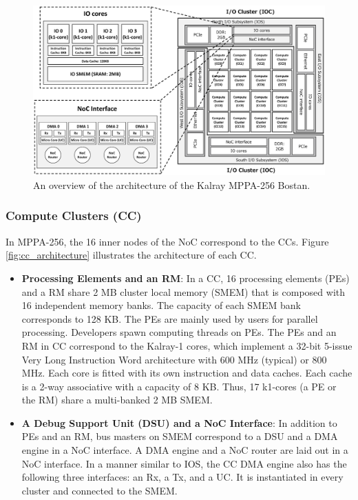 \documentclass{sig-alternate-05-2015}
\begin{document}
\begin{figure}[t]
  \centering
  \includegraphics[width=1.0\linewidth]{../figure/mppa_architecture.eps}
  \caption{\label{fig:mppa_architecture}
    An overview of the architecture of the Kalray MPPA-256 Bostan.}
\end{figure}

\subsubsection{Compute Clusters (CC)}
\label{sec:cc}
In MPPA-256, the 16 inner nodes of the NoC correspond to the CCs.
Figure \ref{fig:cc_architecture} illustrates the architecture of each CC.

\begin{itemize}
\item \textbf{Processing Elements and an RM}:
In a CC, 16 processing elements (PEs) and a RM share 2 MB cluster local memory (SMEM) that is composed with 16 independent memory banks.
The capacity of each SMEM bank corresponds to 128 KB.
The PEs are mainly used by users for parallel processing.
Developers spawn computing threads on PEs.
The PEs and an RM in CC correspond to the Kalray-1 cores, which implement a 32-bit 5-issue Very Long Instruction Word architecture with 600 MHz (typical) or 800 MHz.
Each core is fitted with its own instruction and data caches.
Each cache is a 2-way associative with a capacity of 8 KB.
Thus, 17 k1-cores (a PE or the RM) share a multi-banked 2 MB SMEM.

\item \textbf{A Debug Support Unit (DSU) and a NoC Interface}:
In addition to PEs and an RM, bus masters on SMEM correspond to a DSU and a DMA engine in a NoC interface.
A DMA engine and a NoC router are laid out in a NoC interface.
In a manner similar to IOS, the CC DMA engine also has the following three interfaces: an Rx, a Tx, and a UC. 
It is instantiated in every cluster and connected to the SMEM.
\end{itemize}
\end{document}

